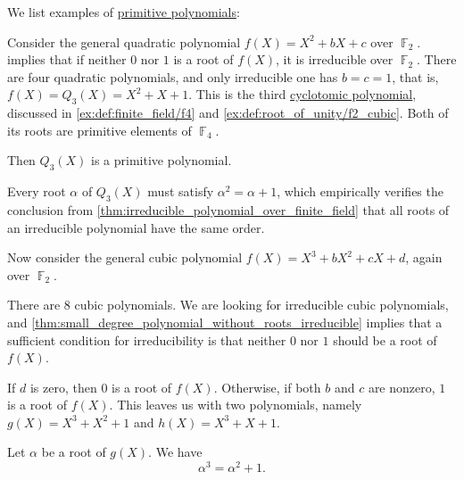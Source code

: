 \begin{example}\label{ex:def:finite_field_primitive_polynomial}
  We list examples of \hyperref[def:finite_field_primitive_polynomial]{primitive polynomials}:
  \begin{thmenum}
     Consider the general quadratic polynomial \( f(X) = X^2 + bX + c \) over \( \BbbF_2 \).  implies that if neither \( 0 \) nor \( 1 \) is a root of \( f(X) \), it is irreducible over \( \BbbF_2 \). There are four quadratic polynomials, and only irreducible one has \( b = c = 1 \), that is, \( f(X) = Q_3(X) = X^2 + X + 1 \). This is the third \hyperref[def:cyclotomic_polynomial]{cyclotomic polynomial}, discussed in \cref{ex:def:finite_field/f4} and \cref{ex:def:root_of_unity/f2_cubic}. Both of its roots are primitive elements of \( \BbbF_4 \).

    Then \( Q_3(X) \) is a primitive polynomial.

    Every root \( \alpha \) of \( Q_3(X) \) must satisfy \( \alpha^2 = \alpha + 1 \), which empirically verifies the conclusion from \cref{thm:irreducible_polynomial_over_finite_field} that all roots of an irreducible polynomial have the same order.

     Now consider the general cubic polynomial \( f(X) = X^3 + bX^2 + cX + d \), again over \( \BbbF_2 \).

    There are \( 8 \) cubic polynomials. We are looking for irreducible cubic polynomials, and \cref{thm:small_degree_polynomial_without_roots_irreducible} implies that a sufficient condition for irreducibility is that neither \( 0 \) nor \( 1 \) should be a root of \( f(X) \).

    If \( d \) is zero, then \( 0 \) is a root of \( f(X) \). Otherwise, if both \( b \) and \( c \) are nonzero, \( 1 \) is a root of \( f(X) \). This leaves us with two polynomials, namely \( g(X) = X^3 + X^2 + 1 \) and \( h(X) = X^3 + X + 1 \).

    Let \( \alpha \) be a root of \( g(X) \). We have
    \begin{equation}\label{ex:def:finite_field_primitive_polynomial/f2_cubic/alpha_third}
      \alpha^3 = \alpha^2 + 1.
    \end{equation}


\end{thmenum}
\end{example}
